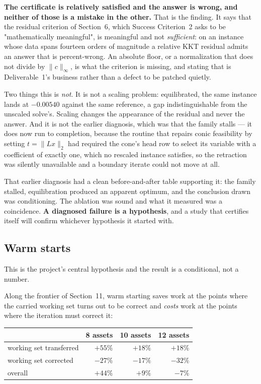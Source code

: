 \documentclass[11pt,a4paper]{article}
\begin{document}
\textbf{The certificate is relatively satisfied and the answer is
wrong, and neither of those is a mistake in the other.} That is the
finding. It says that the residual criterion of Section~6, which
Success Criterion~2 asks to be "mathematically meaningful", is
meaningful and not \emph{sufficient}: on an instance whose data spans
fourteen orders of magnitude a relative KKT residual admits an
answer that is percent-wrong. An absolute floor, or a normalization
that does not divide by $\|c\|_\infty$, is what the criterion is
missing, and stating that is Deliverable~1's business rather than a
defect to be patched quietly.

Two things this is \emph{not}. It is not a scaling problem:
equilibrated, the same instance lands at $-0.00540$ against the same
reference, a gap indistinguishable from the unscaled solve's. Scaling
changes the appearance of the residual and never the answer. And it is
not the earlier diagnosis, which was that the family stalls --- it
does now run to completion, because the routine that repairs conic
feasibility by setting $t=\|Lx\|_2$ had required the cone's head row to
select its variable with a coefficient of exactly one, which no
rescaled instance satisfies, so the retraction was silently
unavailable and a boundary iterate could not move at all.

That earlier diagnosis had a clean before-and-after table supporting
it: the family stalled, equilibration produced an apparent optimum,
and the conclusion drawn was conditioning. The ablation was sound and
what it measured was a coincidence. \textbf{A diagnosed failure is a
hypothesis}, and a study that certifies itself will confirm whichever
hypothesis it started with.

\subsection{Warm starts}

This is the project's central hypothesis and the result is a
conditional, not a number.

Along the frontier of Section~11, warm starting saves work at the
points where the carried working set turns out to be correct and
\emph{costs} work at the points where the iteration must correct it:

\begin{center}
\begin{tabular}{lrrr}
\hline
& 8 assets & 10 assets & 12 assets\\
\hline
working set transferred & $+55\%$ & $+18\%$ & $+18\%$\\
working set corrected & $-27\%$ & $-17\%$ & $-32\%$\\
\hline
overall & $+44\%$ & $+9\%$ & $-7\%$\\
\hline
\end{tabular}
\end{center}
\end{document}
